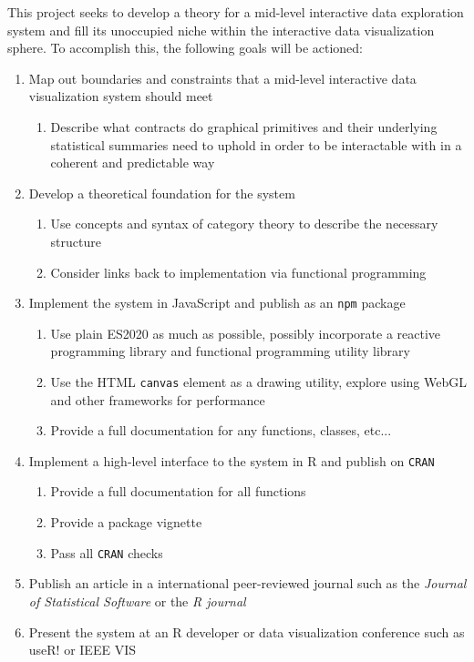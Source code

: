 \documentclass[12pt,a4paper]{article}
\begin{document}
This project seeks to develop a theory for a mid-level interactive data exploration system and fill its unoccupied niche within the interactive data visualization sphere. To accomplish this, the following goals will be actioned:  



\begin{enumerate}

\item
Map out boundaries and constraints that a mid-level interactive data visualization system should meet
  \begin{enumerate}
  \item Describe what contracts do graphical primitives and their underlying statistical summaries need to uphold in order to be interactable with in a coherent and predictable way 
  \end{enumerate}

\item
Develop a theoretical foundation for the system
  \begin{enumerate}
  \item Use concepts and syntax of category theory to describe the necessary structure
  \item Consider links back to implementation via functional programming
  
  \end{enumerate}

\item Implement the system in JavaScript and publish as an \texttt{npm} package
  \begin{enumerate}
  \item Use plain ES2020 as much as possible, possibly incorporate a reactive programming library and functional programming utility library
  \item Use the HTML \texttt{canvas} element as a drawing utility, explore using WebGL and other frameworks for performance
  \item Provide a full documentation for any functions, classes, etc...
  
  \end{enumerate}

\item Implement a high-level interface to the system in R and publish on \texttt{CRAN}
  \begin{enumerate}
  \item Provide a full documentation for all functions
  \item Provide a package vignette
  \item Pass all \texttt{CRAN} checks
  \end{enumerate}
  
\item Publish an article in a international peer-reviewed journal such as the \textit{Journal of Statistical Software} or the \textit{R journal}

\item Present the system at an R developer or data visualization conference such as useR! or IEEE VIS

\end{enumerate}
\end{document}
